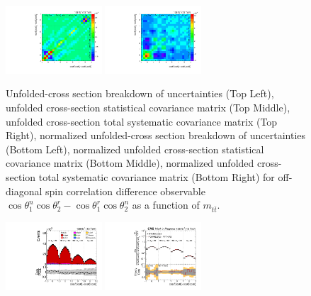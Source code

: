 \begin{refsection}
\begin{figure}[htb]
\begin{center}
 \includegraphics[width=0.32\textwidth]{fig_fullRun2UL/unfolding/combined/StatCovMatrixNorm_rebinnedB_c_Mnr_mttbar.pdf}
 \includegraphics[width=0.32\textwidth]{fig_fullRun2UL/unfolding/combined/TotalSystCovMatrixNorm_rebinnedB_c_Mnr_mttbar.pdf} \\
\caption{Unfolded-cross section breakdown of uncertainties (Top Left), unfolded cross-section statistical covariance matrix (Top Middle), unfolded cross-section total systematic covariance matrix (Top Right), normalized unfolded-cross section breakdown of uncertainties (Bottom Left), normalized unfolded cross-section statistical covariance matrix (Bottom Middle), normalized unfolded cross-section total systematic covariance matrix (Bottom Right) for off-diagonal spin correlation difference observable $\cos\theta_{1}^{n}\cos\theta_{2}^{r}-\cos\theta_{1}^{r}\cos\theta_{2}^{n}$ as a function of $m_{t\bar{t}}$.}
\label{fig:c_Mnr_mttbar_uncertainties}
\end{center}
\end{figure}
\clearpage
\begin{figure}[htb]
\begin{center}
 \includegraphics[width=0.32\textwidth]{fig_fullRun2UL/controlplots/combined/Hyp_LLBarCPnk_vs_TTBarMass.pdf}
 \includegraphics[width=0.32\textwidth]{fig_fullRun2UL/unfolding/combined/UnfoldedResults_c_Pnk_mttbar.pdf}

\end{center}
\end{figure}
\end{refsection}
